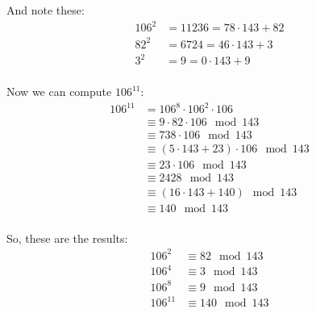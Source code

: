 \documentclass{article}
\begin{document}
And note these:
\begin{align*}
   106^2 &= 11236 = 78 \cdot 143 + 82 \\
   82^2 &= 6724 = 46 \cdot 143 + 3 \\
   3^2 &= 9 = 0 \cdot 143 + 9 \\
\end{align*}

Now we can compute \(106^{11}\):
\begin{align*}
   106^{11} &= 106^8 \cdot 106^2 \cdot 106 \\
   &\equiv 9 \cdot 82 \cdot 106 \mod 143 \\
   &\equiv 738 \cdot 106 \mod 143 \\
   &\equiv (5 \cdot 143 + 23) \cdot 106 \mod 143 \\
   &\equiv 23 \cdot 106 \mod 143 \\
   &\equiv 2428 \mod 143 \\
   &\equiv (16 \cdot 143 + 140) \mod 143 \\
   &\equiv 140 \mod 143 \\
\end{align*}

So, these are the results:
\begin{align*}
   106^2 &\equiv 82 \mod 143 \\
   106^4 &\equiv 3 \mod 143 \\
   106^8 &\equiv 9 \mod 143 \\
   106^{11} &\equiv 140 \mod 143 \\
\end{align*}
\end{document}
